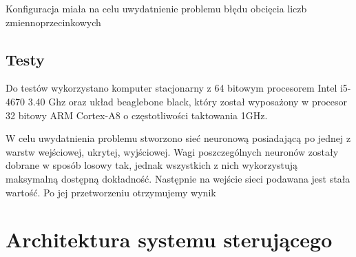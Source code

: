 Konfiguracja miała na celu uwydatnienie problemu błędu obcięcia liczb zmiennoprzecinkowych 

\subsection{Testy}
Do testów wykorzystano komputer stacjonarny z 64 bitowym procesorem Intel i5-4670 3.40 Ghz oraz układ beaglebone black, który został wyposażony w procesor 32 bitowy ARM Cortex-A8 o częstotliwości taktowania 1GHz.

W celu uwydatnienia problemu stworzono sieć neuronową posiadającą po jednej z warstw wejściowej, ukrytej, wyjściowej. Wagi poszczególnych neuronów zostały dobrane w sposób losowy tak, jednak wszystkich z nich wykorzystują maksymalną dostępną dokładność. Następnie na wejście sieci podawana jest stała wartość. Po jej przetworzeniu otrzymujemy wynik  




\section{Architektura systemu sterującego}
